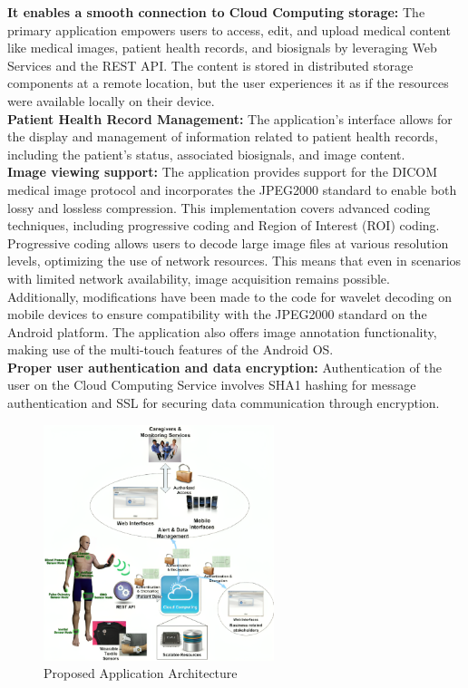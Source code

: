 \documentclass{article}
\begin{document}
\textbf{It enables a smooth connection to Cloud Computing storage:} The primary application empowers users to access, edit, and upload medical content like medical images, patient health records, and biosignals by leveraging Web Services and the REST API.
The content is stored in distributed storage components at a remote location, but the user experiences it as if the resources were available locally on their device. \\

\textbf{Patient Health Record Management:} The application's interface allows for the display and management of information related to patient health records, including the patient's status, associated biosignals, and image content. \\

\textbf{Image viewing support:} The application provides support for the DICOM medical image protocol and incorporates the JPEG2000 standard to enable both lossy and lossless compression. This implementation covers advanced coding techniques, including progressive coding and Region of Interest (ROI) coding. Progressive coding allows users to decode large image files at various resolution levels, optimizing the use of network resources. This means that even in scenarios with limited network availability, image acquisition remains possible. Additionally, modifications have been made to the code for wavelet decoding on mobile devices to ensure compatibility with the JPEG2000 standard on the Android platform. The application also offers image annotation functionality, making use of the multi-touch features of the Android OS.\\

\textbf{Proper user authentication and data encryption:}  Authentication of the user on the Cloud Computing Service involves SHA1 hashing for message authentication and SSL for securing data communication through encryption.

\begin{figure}[H]
\centering
\includegraphics[width=0.6\textwidth]{images/arc.png}
\caption{\label{fig4}Proposed Application Architecture}
\end{figure}
\end{document}
